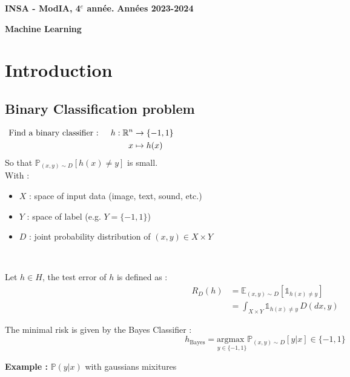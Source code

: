 \documentclass[12pt,a4paper]{article}
\newcommand{\entete}{
    \noindent\textbf{INSA - ModIA, 4$^e$ année.}
    \hfill \textbf{Années 2023-2024}
    
    \begin{center}
        \textbf{\LARGE Machine Learning}
    \end{center}
}
\newcommand{\propriete}[2]{%
    \begin{tcolorbox}[colback=white,colframe=green!25!white,title=\textbf{Propriété #1}, coltitle=black]
        #2
    \end{tcolorbox}
}
\newcommand{\definition}[2]{%
    \begin{tcolorbox}[colback=white,colframe=blue!25!white,title=\textbf{Définition #1}, coltitle=black]
        #2
    \end{tcolorbox}
}
\newcommand{\important}[1]{%
    \begin{tcolorbox}[colback=red!10!white,colframe=red!30!black]
        #1
    \end{tcolorbox}
}
\begin{document}
\entete

\vspace{0.5cm}

\section{Introduction}

\subsection{Binary Classification problem}

\important{
    \vspace{-\baselineskip}\begin{align*}
        \text{Find a binary classifier : } \quad h : \mathbb{R}^n &\to \{-1, 1\} \hspace{14.5cm} \\
        x &\mapsto h(x)\vspace{-\baselineskip}
    \end{align*}
    So that $\mathbb{P}_{(x, y) \sim D} [h(x) \neq y]$ is small.\\
    With :
    \begin{itemize}
        \item $X$ : space of input data (image, text, sound, etc.)
        \item $Y$ : space of label (e.g. $Y = \{-1, 1\}$)
        \item $D$ : joint probability distribution of $(x, y) \in X \times Y$
    \end{itemize}
}

\\

\definition{- Test error of $h$}{
    Let $h \in H$, the test error of $h$ is defined as :
    \begin{align*}
        R_D(h) &= \mathbb{E}_{(x, y) \sim D} [\mathds{1}_{h(x) \neq y}] \\
        &= \int_{X \times Y} \mathds{1}_{h(x) \neq y} \, D(dx, y)
    \end{align*}
}

\propriete{- Bayes Classifier}{
    The minimal risk is given by the Bayes Classifier :
    $$
        h_{\text{Bayes}} = \underset{y \in \{-1, 1\}}{\text{argmax }} \mathbb{P}_{(x, y) \sim D} [y|x] \in \{-1, 1\}
    $$
}

\noindent\textbf{Example :} 
$\mathbb{P}(y | x)$ with gaussians mixitures \\
\end{document}
